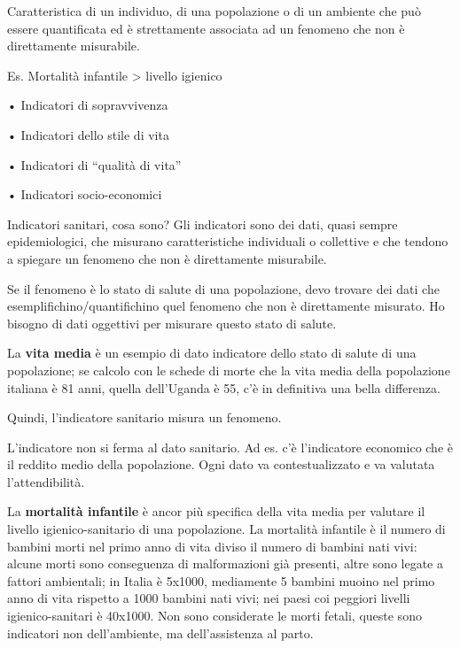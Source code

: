 Caratteristica di un individuo, di una popolazione o di un ambiente che
può essere quantificata ed è strettamente associata ad un fenomeno che
non è direttamente misurabile.

Es. Mortalità infantile \textgreater{} livello igienico

• Indicatori di sopravvivenza

• Indicatori dello stile di vita

• Indicatori di ``qualità di vita''

• Indicatori socio-economici

Indicatori sanitari, cosa sono? Gli indicatori sono dei dati, quasi
sempre epidemiologici, che misurano caratteristiche individuali o
collettive e che tendono a spiegare un fenomeno che non è direttamente
misurabile.

Se il fenomeno è lo stato di salute di una popolazione, devo trovare dei
dati che esemplifichino/quantifichino quel fenomeno che non è
direttamente misurato. Ho bisogno di dati oggettivi per misurare questo
stato di salute.

La \textbf{vita media} è un esempio di dato indicatore dello stato di
salute di una popolazione; se calcolo con le schede di morte che la vita
media della popolazione italiana è 81 anni, quella dell'Uganda è 55, c'è
in definitiva una bella differenza.

Quindi, l'indicatore sanitario misura un fenomeno.

L'indicatore non si ferma al dato sanitario. Ad es. c'è l'indicatore
economico che è il reddito medio della popolazione. Ogni dato va
contestualizzato e va valutata l'attendibilità.

La \textbf{mortalità infantile} è ancor più specifica della vita media
per valutare il livello igienico-sanitario di una popolazione. La
mortalità infantile è il numero di bambini morti nel primo anno di vita
diviso il numero di bambini nati vivi: alcune morti sono conseguenza di
malformazioni già presenti, altre sono legate a fattori ambientali; in
Italia è 5x1000, mediamente 5 bambini muoino nel primo anno di vita
rispetto a 1000 bambini nati vivi; nei paesi coi peggiori livelli
igienico-sanitari è 40x1000. Non sono considerate le morti fetali,
queste sono indicatori non dell'ambiente, ma dell'assistenza al parto.

